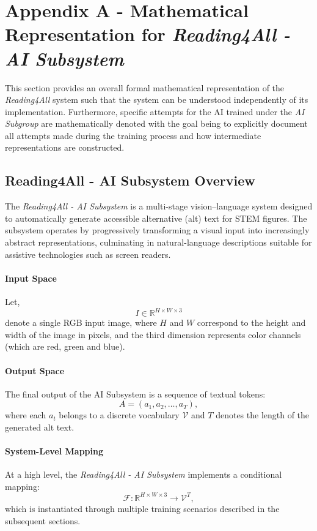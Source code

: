 \documentclass[12pt, titlepage]{article}
\begin{document}
\newpage
\section{Appendix A - Mathematical Representation for
\textit{Reading4All - AI Subsystem}}
This section provides an overall formal mathematical representation of the
\textit{Reading4All} system such that the system can be understood
independently of its implementation. Furthermore, specific attempts for the
AI trained under the \textit{AI Subgroup} are mathematically denoted with the
goal being to explicitly document all attempts made during the training
process and how intermediate representations are constructed.

\subsection{Reading4All - AI Subsystem Overview}

The \textit{Reading4All - AI Subsystem} is a multi-stage vision--language system
designed to automatically generate accessible alternative (alt) text for STEM
figures. The subsystem operates by progressively transforming a visual input
into increasingly abstract representations, culminating in natural-language
descriptions suitable for assistive technologies such as screen readers.

\paragraph{Input Space}
Let,
\[
I \in \mathbb{R}^{H \times W \times 3}
\]
denote a single RGB input image, where $H$ and $W$ correspond to the height and
width of the image in pixels, and the third dimension represents color channels (which are red, green and blue).

\paragraph{Output Space}
The final output of the AI Subsystem is a sequence of textual tokens:
\[
A = (a_1, a_2, \dots, a_T),
\]
where each $a_t$ belongs to a discrete vocabulary $\mathcal{V}$ and $T$ denotes
the length of the generated alt text.

\paragraph{System-Level Mapping}
At a high level, the \textit{Reading4All - AI Subsystem} implements a conditional mapping:
\[
\mathcal{F}: \mathbb{R}^{H \times W \times 3} \rightarrow \mathcal{V}^T,
\]
which is instantiated through multiple training scenarios described in the
subsequent sections.
\end{document}
